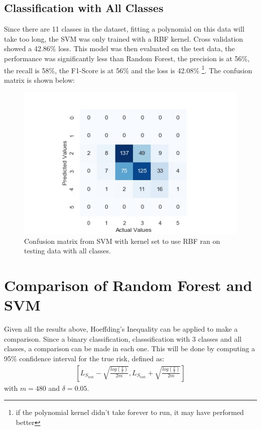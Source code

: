 \documentclass[11pt,a4paper,titlepage]{article}
\begin{document}
	\subsection{Classification with All Classes}
	Since there are 11 classes in the dataset, fitting a polynomial on this data will take too long, the SVM was only trained with a RBF kernel. Cross validation showed a 42.86\% loss. This model was then evaluated on the test data, the performance was significantly less than Random Forest, the precision is at 56\%, the recall is 58\%, the F1-Score is at 56\% and the loss is 42.08\% \footnote{if the polynomial kernel didn't take forever to run, it may have performed better}. The confusion matrix is shown below:
	\begin{figure}[H]
		\centering
		\includegraphics[scale=0.6]{img/allclass_svmrbf.jpg}
		\caption{Confusion matrix from SVM with kernel set to use RBF ran on testing data with all classes.}
	\end{figure}
	\section{Comparison of Random Forest and SVM}
	Given all the results above, Hoeffding's Inequality can be applied to make a comparison. Since a binary classification, classsification with 3 classes and all classes, a comparison can be made in each one. This will be done by computing a 95\% confidence interval for the true risk, defined as:
	\begin{align*}
	\left[L_{S_{\text{test}}}-\sqrt{\frac{log\left(\frac{2}{\delta}\right)}{2m}},L_{S_{\text{test}}}+\sqrt{\frac{log\left(\frac{2}{\delta}\right)}{2m}}\right]
	\end{align*}
	with $m=480$ and $\delta=0.05$.
\end{document}
